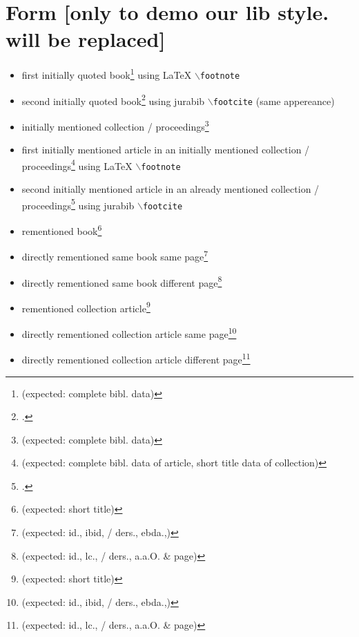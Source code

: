\section{Form [only to demo our lib style. will be replaced]}
\begin{itemize}
  \item first initially quoted book\footnote{\cite[cf.][123ff]{Grassmuck2002a}
  (expected: complete bibl. data)} using LaTeX \texttt{$\backslash$footnote}
  \item second initially quoted book\footcite[cf.][120 (expected: complete bibl.
  data)]{Fogel2006a} using jurabib \texttt{$\backslash$footcite} (same
  appereance)
  \item initially mentioned collection /
  proceedings\footnote{\cite[cf.][123ff]{DjoGehGraKreSpi2008a} (expected: complete
  bibl. data)}
  \item first initially mentioned article in an initially mentioned collection /
  proceedings\footnote{\cite[cf.][123ff]{Spielkamp2008a} (expected: complete
  bibl. data of article, short title data of collection)} using LaTeX
  \texttt{$\backslash$footnote}
  \item second initially mentioned article in an already mentioned collection
  / proceedings\footcite[cf.][123ff (expected: complete
  bibl. data of article, short title data of collection)]{Kreutzer2008a} using
  jurabib \texttt{$\backslash$footcite} 
  \item rementioned book\footnote{\cite[cf.][120]{Fogel2006a} (expected: short
  title)}
  \item directly rementioned same book same
  page\footnote{\cite[cf.][120]{Fogel2006a} (expected: id., ibid, / ders.,
  ebda.,)}
  \item directly rementioned same book different
  page\footnote{\cite[cf.][121]{Fogel2006a} (expected: id., lc., / ders.,
  a.a.O. \& page)}
  \item rementioned collection article\footnote{\cite[cf.][120 ]{Kreutzer2008a} (expected: short
  title)}
  \item directly rementioned collection article same
  page\footnote{\cite[cf.][120]{Kreutzer2008a} (expected: id., ibid, / ders.,
  ebda.,)}
  \item directly rementioned collection article different
  page\footnote{\cite[cf.][121]{Kreutzer2008a} (expected: id., lc., / ders.,
  a.a.O. \& page)}
\end{itemize}

%

